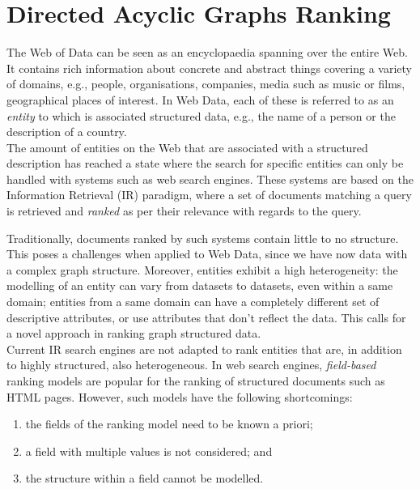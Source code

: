 \chapter{Directed Acyclic Graphs Ranking}
\label{chap6:ranking}

The Web of Data can be seen as an encyclopaedia spanning over the entire Web. It contains rich information about concrete and abstract things covering a variety of domains, e.g., people, organisations, companies, media such as music or films, geographical places of interest. In Web Data, each of these is referred to as an \emph{entity} to which is associated structured data, e.g., the name of a person or the description of a country.\\

The amount of entities on the Web that are associated with a structured description has reached a state where the search for specific entities can only be handled with systems such as web search engines. These systems are based on the Information Retrieval (IR) paradigm, where a set of documents matching a query is retrieved and \emph{ranked} as per their relevance with regards to the query.

Traditionally, documents ranked by such systems contain little to no structure. This poses a challenges when applied to Web Data, since we have now data with a complex graph structure. Moreover, entities exhibit a high heterogeneity: the modelling of an entity can vary from datasets to datasets, even within a same domain; entities from a same domain can have a completely different set of descriptive attributes, or use attributes that don't reflect the data. This calls for a novel approach in ranking graph structured data.\\

Current IR search engines are not adapted to rank entities that are, in addition to highly structured, also heterogeneous. In web search engines, \emph{field-based} ranking models are popular for the ranking of structured documents such as HTML pages. However, such models have the following shortcomings:
\begin{enumerate}
	\item the fields of the ranking model need to be known a priori;
	\item a field with multiple values is not considered; and
	\item the structure within a field cannot be modelled.
\end{enumerate}

